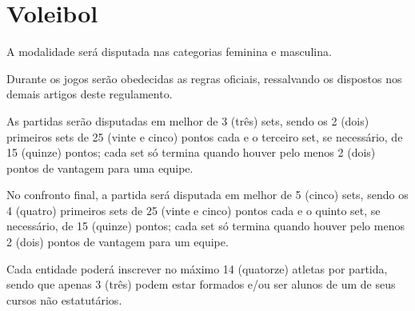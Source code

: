 {\let\clearpage\relax \chapter{Voleibol}}

\begin{article}
	A modalidade será disputada nas categorias feminina e masculina.
\end{article}

\begin{article}
	Durante os jogos serão obedecidas as regras oficiais, ressalvando os dispostos nos demais artigos deste regulamento.
\end{article}

\begin{article}
	As partidas serão disputadas em melhor de 3 (três) sets, sendo os 2 (dois) primeiros sets de 25 (vinte e cinco) pontos cada e o terceiro set, se necessário, de 15 (quinze) pontos; cada set só termina quando houver pelo menos 2 (dois) pontos de vantagem para uma equipe.

	\begin{xparagraph}
		No confronto final, a partida será disputada em melhor de 5 (cinco) sets, sendo os 4 (quatro) primeiros sets de 25 (vinte e cinco) pontos cada e o quinto set, se necessário, de 15 (quinze) pontos; cada set só termina quando houver pelo menos 2 (dois) pontos de vantagem para um equipe.
	\end{xparagraph}
\end{article}

\begin{article}
	Cada entidade poderá inscrever no máximo 14 (quatorze) atletas por partida, sendo que apenas 3 (três) podem estar formados e/ou ser alunos de um de seus cursos não estatutários.
\end{article}
